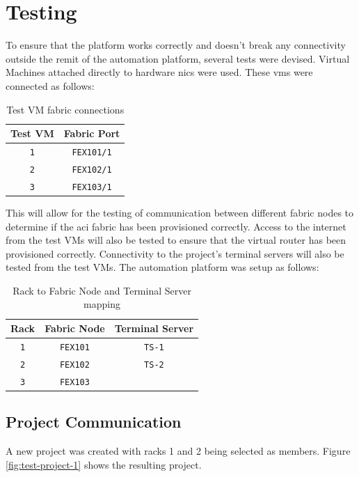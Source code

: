 \chapter{Testing}
\label{chap:testing}
To ensure that the platform works correctly and doesn't break any connectivity outside the remit of the automation platform, several tests were devised. Virtual Machines attached directly to hardware \gls{nic}s were used. These \gls{vm}s were connected as follows:

\begin{table}[htbp]
    \centering
    \begin{tabular}{@{} c c @{}}
        \toprule
        \textbf{Test VM}     & \textbf{Fabric Port} \\
        \midrule
        \texttt{1} & \texttt{FEX101/1}    \\
        \texttt{2} & \texttt{FEX102/1}    \\
        \texttt{3} & \texttt{FEX103/1}    \\
        \bottomrule
    \end{tabular}
    \caption{Test VM fabric connections}
\end{table}

This will allow for the testing of communication between different fabric nodes to determine if the \gls{aci} fabric has been provisioned correctly. Access to the internet from the test VMs will also be tested to ensure that the virtual router has been provisioned correctly. Connectivity to the project's terminal servers will also be tested from the test VMs.
The automation platform was setup as follows:

\begin{table}[htbp]
    \centering
    \begin{tabular}{@{} c c c @{}}
        \toprule
        \textbf{Rack}     & \textbf{Fabric Node} & \textbf{Terminal Server} \\
        \midrule
        \texttt{1} & \texttt{FEX101} & \texttt{TS-1}    \\
        \texttt{2} & \texttt{FEX102} & \texttt{TS-2}  \\
        \texttt{3} & \texttt{FEX103} &   \\
        \bottomrule
    \end{tabular}
    \caption{Rack to Fabric Node and Terminal Server mapping}
\end{table}


\section{Project Communication}
A new project was created with racks 1 and 2 being selected as members. Figure \ref{fig:test-project-1} shows the resulting project.

